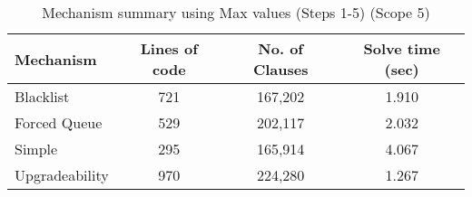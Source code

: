 \begin{table}[htbp]
\centering
\begin{tabular}{|l|c|c|c|}
\hline
\textbf{Mechanism} & \textbf{Lines of code} & \textbf{No. of Clauses} & \textbf{Solve time (sec)} \\
\hline
Blacklist & 721 & 167,202 & 1.910 \\
Forced Queue & 529 & 202,117 & 2.032 \\
Simple & 295 & 165,914 & 4.067 \\
Upgradeability & 970 & 224,280 & 1.267 \\
\hline
\end{tabular}
\caption{Mechanism summary using Max values (Steps 1-5) (Scope 5)}
\label{tab:mechanism_summary_max_steps_5}
\end{table}